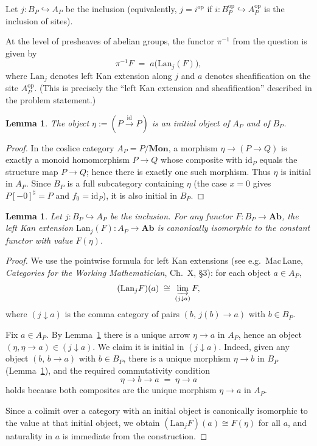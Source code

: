 \documentclass[11pt]{article}
\newtheorem{lemma}[theorem]{Lemma}
\theoremstyle{remark}
\begin{document}
Let $j\colon B_P\hookrightarrow A_P$ be the inclusion (equivalently, $j=i^{\mathrm{op}}$ if
$i\colon B_P^{\mathrm{op}}\hookrightarrow A_P^{\mathrm{op}}$ is the inclusion of sites).

At the level of presheaves of abelian groups, the functor $\pi^{-1}$ from the question is
given by
\[
\pi^{-1}F \;=\; a\bigl(\mathrm{Lan}_j(F)\bigr),
\]
where $\mathrm{Lan}_j$ denotes left Kan extension along $j$ and $a$ denotes sheafification
on the site $A_P^{\mathrm{op}}$. (This is precisely the ``left Kan extension and
sheafification'' described in the problem statement.)

\begin{lemma}\label{lem:initial}
The object $\eta:=(P\xrightarrow{\mathrm{id}}P)$ is an initial object of $A_P$ and of $B_P$.
\end{lemma}

\begin{proof}
In the coslice category $A_P=P/\mathbf{Mon}$, a morphism $\eta\to (P\to Q)$ is exactly a
monoid homomorphism $P\to Q$ whose composite with $\mathrm{id}_P$ equals the structure map
$P\to Q$; hence there is exactly one such morphism. Thus $\eta$ is initial in $A_P$.
Since $B_P$ is a full subcategory containing $\eta$ (the case $x=0$ gives
$P[-0]^\sharp=P$ and $f_0=\mathrm{id}_P$), it is also initial in $B_P$.
\end{proof}

\begin{lemma}\label{lem:Lan_constant}
Let $j\colon B_P\hookrightarrow A_P$ be the inclusion. For any functor
$F\colon B_P\to \mathbf{Ab}$, the left Kan extension $\mathrm{Lan}_j(F)\colon A_P\to\mathbf{Ab}$
is canonically isomorphic to the constant functor with value $F(\eta)$.
\end{lemma}

\begin{proof}
We use the pointwise formula for left Kan extensions (see e.g.\
Mac\,Lane, \emph{Categories for the Working Mathematician}, Ch.~X, \S3):
for each object $a\in A_P$,
\[
(\mathrm{Lan}_jF)(a)\;\cong\;\varinjlim_{(j\downarrow a)} F,
\]
where $(j\downarrow a)$ is the comma category of pairs $(b,\,j(b)\to a)$ with $b\in B_P$.

Fix $a\in A_P$. By Lemma~\ref{lem:initial} there is a unique arrow $\eta\to a$ in $A_P$,
hence an object $(\eta,\eta\to a)\in (j\downarrow a)$.
We claim it is initial in $(j\downarrow a)$.
Indeed, given any object $(b,\,b\to a)$ with $b\in B_P$, there is a unique morphism
$\eta\to b$ in $B_P$ (Lemma~\ref{lem:initial}), and the required commutativity condition
\[
\eta \longrightarrow b \longrightarrow a \;=\; \eta \longrightarrow a
\]
holds because both composites are the unique morphism $\eta\to a$ in $A_P$.

Since a colimit over a category with an initial object is canonically isomorphic to the
value at that initial object, we obtain $(\mathrm{Lan}_jF)(a)\cong F(\eta)$ for all $a$, and
naturality in $a$ is immediate from the construction.
\end{proof}
\end{document}
